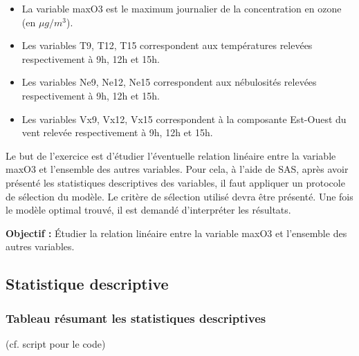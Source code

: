 \documentclass[12pt,a4paper]{article}
\begin{document}
\begin{itemize}
	\item La variable maxO3 est le maximum journalier de la concentration en ozone (en $\mu g/m^3$).
	\item Les variables T9, T12, T15 correspondent aux températures relevées respectivement à 9h, 12h et 15h.
	\item Les variables Ne9, Ne12, Ne15 correspondent aux nébulosités relevées respectivement à 9h, 12h et 15h.
	\item Les variables Vx9, Vx12, Vx15 correspondent à la composante Est-Ouest du vent relevée respectivement à 9h, 12h et 15h.
\end{itemize}

Le but de l’exercice est d’étudier l’éventuelle relation linéaire entre la variable maxO3 et l’ensemble des autres variables. Pour cela, à l’aide de SAS, après avoir présenté les statistiques descriptives des variables, il faut appliquer un protocole de sélection du modèle. Le critère de sélection utilisé devra être présenté. Une fois le modèle optimal trouvé, il est demandé d’interpréter les résultats.

\textbf{Objectif :} Étudier la relation linéaire entre la variable maxO3 et l'ensemble des autres variables.

\subsection{Statistique descriptive}
\subsubsection{Tableau résumant les statistiques descriptives}
(cf. script pour le code)
\end{document}
